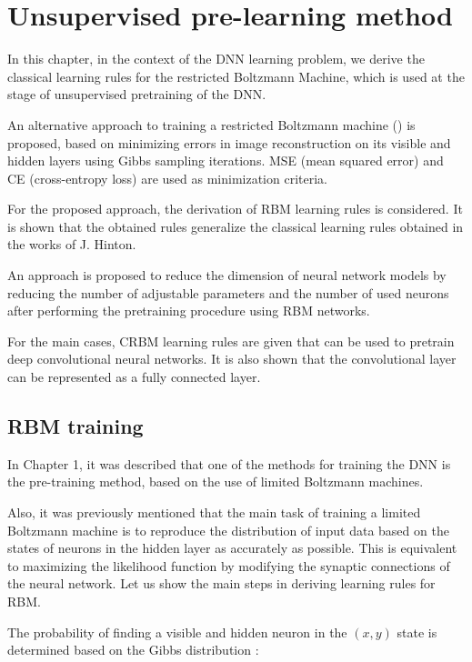 \chapter{Unsupervised pre-learning method}

In this chapter, in the context of the DNN learning problem, we derive the classical learning rules for the restricted Boltzmann Machine, which is used at the stage of unsupervised pretraining of the DNN.

An alternative approach to training a restricted Boltzmann machine (\cite{1-A, 4-A, 5-A}) is proposed, based on minimizing errors in image reconstruction on its visible and hidden layers using Gibbs sampling iterations. MSE (mean squared error) and CE (cross-entropy loss) are used as minimization criteria.

For the proposed approach, the derivation of RBM learning rules is considered. It is shown that the obtained rules generalize the classical learning rules obtained in the works of J. Hinton.

An approach is proposed to reduce the dimension of neural network models by reducing the number of adjustable parameters and the number of used neurons after performing the pretraining procedure using RBM networks.

For the main cases, CRBM learning rules are given that can be used to pretrain deep convolutional neural networks. It is also shown that the convolutional layer can be represented as a fully connected layer.

\section{RBM training}

In Chapter 1, it was described that one of the methods for training the DNN is the pre-training method, based on the use of limited Boltzmann machines.

Also, it was previously mentioned that the main task of training a limited Boltzmann machine is to reproduce the distribution of input data based on the states of neurons in the hidden layer as accurately as possible. This is equivalent to maximizing the likelihood function by modifying the synaptic connections of the neural network. Let us show the main steps in deriving learning rules for RBM.

The probability of finding a visible and hidden neuron in the $(x, y)$ state is determined based on the Gibbs distribution \cite{gibbs1902}:

